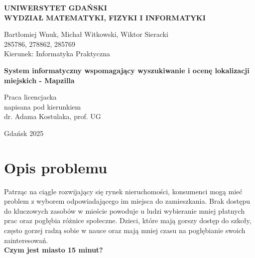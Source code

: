 \documentclass{article}
\begin{document}
\begin{titlepage}
    \centering

    \vspace*{2cm}
    {\Large\bfseries UNIWERSYTET GDAŃSKI}\\[1.5em]
    {\large\bfseries WYDZIAŁ MATEMATYKI, FIZYKI I INFORMATYKI}

    \vfill

    {\large Bartłomiej Wnuk, Michał Witkowski, Wiktor Sieracki}\\
    {\large 285786, 278862, 285769}\\[4em]

    {Kierunek: Informatyka Praktyczna}\\[2.5em]

    \vfill

    {\huge\bfseries System informatyczny wspomagający wyszukiwanie i ocenę lokalizacji miejskich - Mapzilla}\\[6em]

    \vfill

    {\large Praca licencjacka}\\[1em]

    {napisana pod kierunkiem}\\[1.5em]

    dr. Adama Kostulaka, prof. UG \\[2em]

    \vfill

    {\large Gdańsk 2025}

    \vspace*{1cm}

\end{titlepage}

\tableofcontents
\newpage

\section{Opis problemu}

Patrząc na ciągle rozwijający się rynek nieruchomości, konsumenci mogą mieć problem z wyborem odpowiadającego im miejsca do zamieszkania. Brak dostępu do kluczowych zasobów w mieście powoduje u ludzi wybieranie mniej płatnych prac oraz pogłębia różnice społeczne. Dzieci, które mają gorszy dostęp do szkoły, często gorzej radzą sobie w nauce oraz mają mniej czasu na pogłębianie swoich zainteresowań.
\\

\noindent
\textbf{Czym jest miasto 15 minut?}  
\end{document}
